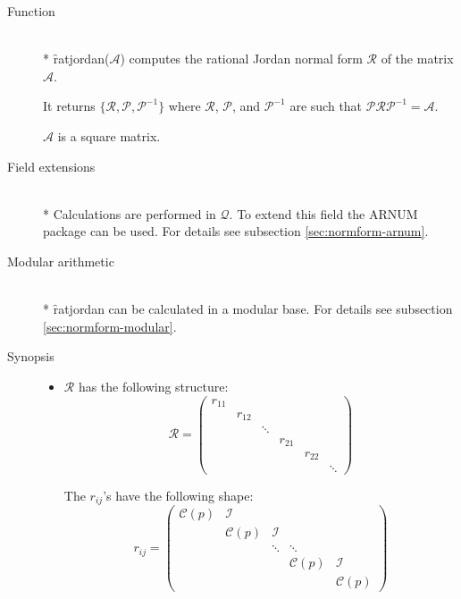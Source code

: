\begin{description}
\item[Function]\mbox{}\\*
\f{ratjordan}($\mathcal{A}$) computes the rational Jordan normal form 
$\mathcal{R}$ of the matrix $\mathcal{A}$.

It returns $\{\mathcal{R}, \mathcal{P}, \mathcal{P}^{-1}\}$ where $\mathcal{R}$, 
$\mathcal{P}$, and $\mathcal{P}^{-1}$ are such that $\mathcal{P R P}^{-1} = 
\mathcal{A}$.

$\mathcal{A}$ is a square matrix.

\item[Field extensions]\mbox{}\\*
Calculations are performed in $\mathcal{Q}$. To extend this field the 
{\small ARNUM} package can be used. For details see subsection \ref{sec:normform-arnum}.

\item[Modular arithmetic]\mbox{}\\*
\f{ratjordan} can be calculated in a modular base. For details see 
subsection \ref{sec:normform-modular}.

\item[Synopsis]

\begin{itemize}
\item $\mathcal{R}$ has the following structure:
      \begin{displaymath}
      \mathcal{R} = \begin{pmatrix} r_{11} \\  & 
      r_{12} \\  &  & \ddots \\  &  &  & r_{21}  \\ &  &  
      &  &  r_{22} \\ &  &  &  &  & \ddots \end{pmatrix} 
      \end{displaymath}

      The $r_{ij}$'s have the following shape:  
      \begin{displaymath}
      r_{ij} = \begin{pmatrix} \mathcal{C}(p) & 
      \mathcal{I}  &  &  & \\  &  \mathcal{C}(p) & \mathcal{I}  & & \\ & 
      & \ddots & \ddots & \\ &  &  &  \mathcal{C}(p) & \mathcal{I} \\ &
      &  &  & \mathcal{C}(p) \end{pmatrix} 
      \end{displaymath}


\end{itemize}
\end{description}
